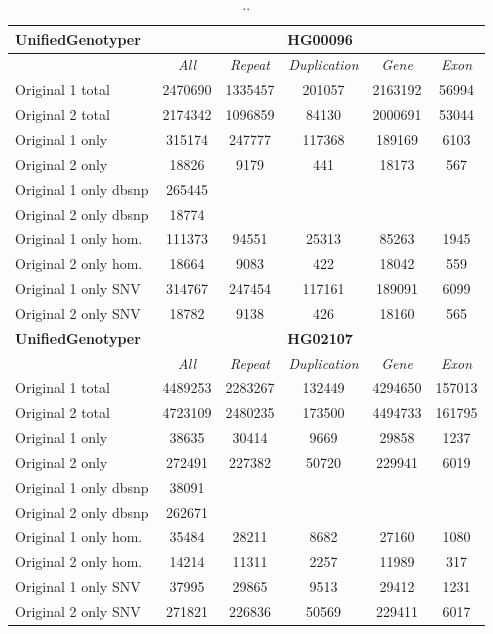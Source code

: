 \begin{table}[htb]
\begin{center}
\begin{tabular}{|l|c||c|c|c|c|}
\hline
{\bf UnifiedGenotyper} & \multicolumn{5}{|c|}{\bf HG00096} \\
\hline
\cline{2-6}
{\bf} & {\it All} & {\it Repeat} & {\it Duplication} & {\it Gene} & {\it Exon} \\
\hline
Original 1 total & 2470690 & 1335457 & 201057 & 2163192 & 56994\\ 
\hline
Original 2 total & 2174342 & 1096859 & 84130 & 2000691 & 53044\\ 
\hline
Original 1 only & 315174 & 247777 & 117368 & 189169 & 6103\\ 
\hline
Original 2 only & 18826 & 9179 & 441 & 18173 & 567\\ 
\hline
Original 1 only dbsnp & 265445 &  &  &  & \\ 
\hline
Original 2 only dbsnp & 18774 &  &  &  & \\ 
\hline
Original 1 only hom. & 111373 & 94551 & 25313 & 85263 & 1945\\ 
\hline
Original 2 only hom. & 18664 & 9083 & 422 & 18042 & 559\\ 
\hline
Original 1 only SNV & 314767 & 247454 & 117161 & 189091 & 6099\\ 
\hline
Original 2 only SNV & 18782 & 9138 & 426 & 18160 & 565\\ 
\hline
\hline
{\bf UnifiedGenotyper} & \multicolumn{5}{|c|}{\bf HG02107} \\
\hline
\cline{2-6}
{\bf} & {\it All} & {\it Repeat} & {\it Duplication} & {\it Gene} & {\it Exon} \\
\hline
Original 1 total & 4489253 & 2283267 & 132449 & 4294650 & 157013\\ 
\hline
Original 2 total & 4723109 & 2480235 & 173500 & 4494733 & 161795\\ 
\hline
Original 1 only & 38635 & 30414 & 9669 & 29858 & 1237\\ 
\hline
Original 2 only & 272491 & 227382 & 50720 & 229941 & 6019\\ 
\hline
Original 1 only dbsnp & 38091 &  &  &  & \\ 
\hline
Original 2 only dbsnp & 262671 &  &  &  & \\ 
\hline
Original 1 only hom. & 35484 & 28211 & 8682 & 27160 & 1080\\ 
\hline
Original 2 only hom. & 14214 & 11311 & 2257 & 11989 & 317\\ 
\hline
Original 1 only SNV & 37995 & 29865 & 9513 & 29412 & 1231\\ 
\hline
Original 2 only SNV & 271821 & 226836 & 50569 & 229411 & 6017\\ 
\hline
\end{tabular}
\end{center}
\caption{ .. }
\label{tab:orig-vs-shuf-ug}
\end{table}

